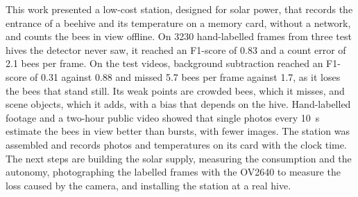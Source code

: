 \documentclass[english,hidelinks]{sbrt}
\begin{document}
This work presented a low-cost station, designed for solar power, that records the entrance of a beehive and its temperature on a memory card, without a network, and counts the bees in view offline. On 3230 hand-labelled frames from three test hives the detector never saw, it reached an F1-score of 0.83 and a count error of 2.1 bees per frame. On the test videos, background subtraction reached an F1-score of 0.31 against 0.88 and missed 5.7 bees per frame against 1.7, as it loses the bees that stand still. Its weak points are crowded bees, which it misses, and scene objects, which it adds, with a bias that depends on the hive. Hand-labelled footage and a two-hour public video showed that single photos every 10~s estimate the bees in view better than bursts, with fewer images. The station was assembled and records photos and temperatures on its card with the clock time. The next steps are building the solar supply, measuring the consumption and the autonomy, photographing the labelled frames with the OV2640 to measure the loss caused by the camera, and installing the station at a real hive.



\end{document}

